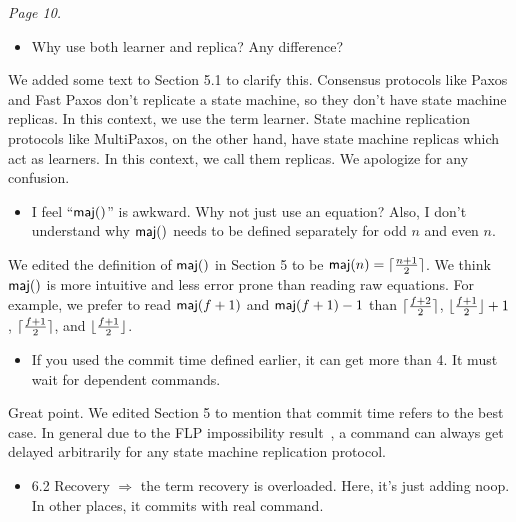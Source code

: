 \documentclass[letterpaper,twocolumn,10pt]{article}
\newenvironment{reviewerquote}
{\list{}{\leftmargin=\parindent\rightmargin=0in}\item[] \itshape \color{ReviewerDarkGray}}%
{\endlist}
\begin{document}
\begin{reviewerquote}
  Page 10.

  \begin{itemize}
    \item
      Why use both learner and replica? Any difference?
  \end{itemize}
\end{reviewerquote}

We added some text to Section 5.1 to clarify this. Consensus protocols like
Paxos and Fast Paxos don't replicate a state machine, so they don't have state
machine replicas. In this context, we use the term learner. State machine
replication protocols like MultiPaxos, on the other hand, have state machine
replicas which act as learners. In this context, we call them replicas. We
apologize for any confusion.

\begin{reviewerquote}
  \begin{itemize}
    \item
      I feel ``$\textsf{maj}()$'' is awkward. Why not just use an equation? Also, I
      don't understand why $\textsf{maj}()$ needs to be defined separately for odd $n$
      and even $n$.
  \end{itemize}
\end{reviewerquote}

We edited the definition of $\textsf{maj}()$ in Section 5 to be $\textsf{maj}(n) =
\lceil\frac{n+1}{2}\rceil$. We think $\textsf{maj}()$ is more intuitive and less error prone
than reading raw equations. For example, we prefer to read $\textsf{maj}(f+1)$ and
$\textsf{maj}(f+1) - 1$ than $\lceil\frac{f+2}{2}\rceil$, $\lfloor\frac{f+1}{2}\rfloor + 1$,
$\lceil\frac{f+1}{2}\rceil$, and $\lfloor\frac{f+1}{2}\rfloor$.

\begin{reviewerquote}
  \begin{itemize}
    \item
      If you used the commit time defined earlier, it can get more than 4. It
      must wait for dependent commands.
  \end{itemize}
\end{reviewerquote}

Great point. We edited Section 5 to mention that commit time refers to the best
case. In general due to the FLP impossibility
result~\cite{fischer1982impossibility}, a command can always get delayed
arbitrarily for any state machine replication protocol.

\begin{reviewerquote}
  \begin{itemize}
    \item
      6.2 Recovery $\Rightarrow$ the term recovery is overloaded. Here, it's
      just adding noop. In other places, it commits with real command.
  \end{itemize}
\end{reviewerquote}
\end{document}
